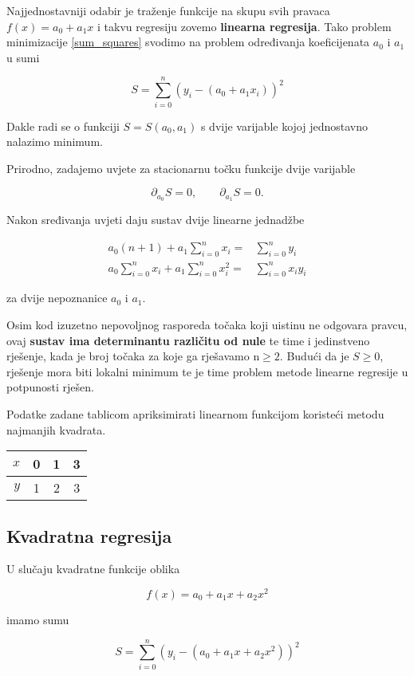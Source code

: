Najjednostavniji odabir je traženje funkcije na skupu svih pravaca $f(x) = a_0 + a_1x$ i takvu regresiju zovemo \textbf{linearna regresija}. Tako problem minimizacije \ref{sum_squares} svodimo na problem određivanja koeficijenata $a_0$ i $a_1$ u sumi

$$
S = \sum_{i=0}^n(y_i - (a_0+a_1x_i))^2
$$

Dakle radi se o funkciji $S=S(a_0,a_1)$ s dvije varijable kojoj jednostavno nalazimo minimum.

Prirodno, zadajemo uvjete za stacionarnu točku funkcije dvije varijable

$$
\partial_{a_0}S=0,\qquad\partial_{a_1}S=0.
$$

Nakon sređivanja uvjeti daju sustav dvije linearne jednadžbe

\begin{align*}
a_0(n+1)+a_1\sum_{i=0}^nx_i=&\sum_{i=0}^ny_i\\
a_0\sum_{i=0}^nx_i+a_1\sum_{i=0}^nx_i^2=&\sum_{i=0}^nx_iy_i
\end{align*}

za dvije nepoznanice $a_0$ i $a_1$.

Osim kod izuzetno nepovoljnog rasporeda točaka koji uistinu ne odgovara pravcu, ovaj \textbf{sustav ima determinantu različitu od nule} te time i jedinstveno rješenje, kada je broj točaka za koje ga rješavamo n$\geq2$.
Budući da je $S\geq0$, rješenje mora biti lokalni minimum te je time problem metode linearne regresije u potpunosti rješen.

\begin{examplebox}
    Podatke zadane tablicom apriksimirati linearnom funkcijom koristeći metodu najmanjih kvadrata.

    \center
    \begin{tabular}{r|c|c|c}
        $x$ & 0 & 1 & 3 \\
        \hline
        $y$ & 1 & 2 & 3
    \end{tabular}
\end{examplebox}

\subsection{Kvadratna regresija}

U slučaju kvadratne funkcije oblika

$$
f(x) = a_0+a_1x+a_2x^2
$$

imamo sumu

$$
S = \sum_{i=0}^n(y_i - (a_0+a_1x+a_2x^2))^2
$$


